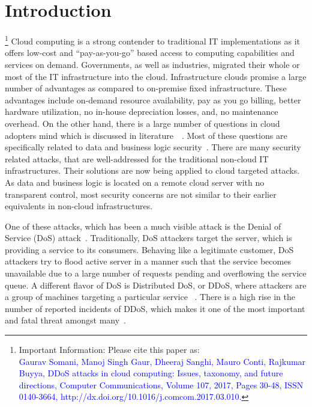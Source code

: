 \documentclass[final,5p,times,twocolumn]{elsarticle}
\begin{document}
\section{Introduction}
\footnote{Important Information: Please cite this paper as:\\ \textcolor{blue}{Gaurav Somani, Manoj Singh Gaur, Dheeraj Sanghi, Mauro Conti, Rajkumar Buyya, DDoS attacks in cloud computing: Issues, taxonomy, and future directions, Computer Communications, Volume 107, 2017, Pages 30-48, ISSN 0140-3664,  http://dx.doi.org/10.1016/j.comcom.2017.03.010.}}
Cloud computing is a strong contender to traditional IT implementations as it offers low-cost and ``pay-as-you-go'' based access to computing capabilities and services on demand. Governments, as well as industries, migrated their whole or most of the IT infrastructure into the cloud. Infrastructure clouds promise a large number of advantages as compared to on-premise fixed infrastructure. These advantages include on-demand resource availability, pay as you go billing, better hardware utilization, no in-house depreciation losses, and, no maintenance overhead. On the other hand, there is a large number of questions in cloud adopters mind which is discussed in literature~\cite{Cloudsec1}~\cite{Cloudsec2}. Most of these questions are specifically related to data and business logic security~\cite{kaufman}. There are many security related attacks, that are well-addressed for the traditional non-cloud IT infrastructures. Their solutions are now being applied to cloud targeted attacks. As data and business logic is located on a remote cloud server with no transparent control, most security concerns are not similar to their earlier equivalents in non-cloud infrastructures.
\par One of these attacks, which has been a much visible attack is the Denial of Service (DoS) attack~\cite{Addressing}. Traditionally, DoS attackers target the server, which is providing a service to its consumers. Behaving like a legitimate customer, DoS attackers try to flood active server in a manner such that the service becomes unavailable due to a large number of requests pending and overflowing the service queue. A different flavor of DoS is Distributed DoS, or DDoS, where attackers are a group of machines targeting a particular service ~\cite{Mirk}. There is a high rise in the number of reported incidents of DDoS, which makes it one of the most important and fatal threat amongst many~\cite{mansfield2015growth}.  
\end{document}

